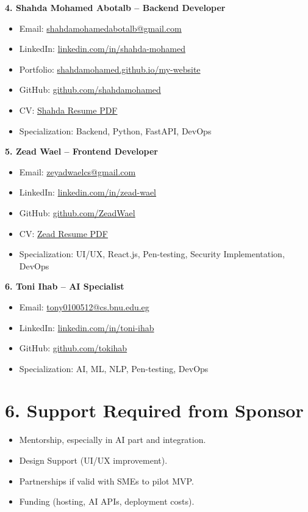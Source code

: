 \documentclass[12pt,a4paper]{article}
\begin{document}
\textbf{4. Shahda Mohamed Abotalb – Backend Developer}  
\begin{itemize}
    \item Email: \href{mailto:shahdamohamedabotalb@gmail.com}{shahdamohamedabotalb@gmail.com}
    \item LinkedIn: \href{https://www.linkedin.com/in/shahda-mohamed-178537280}{linkedin.com/in/shahda-mohamed}
    \item Portfolio: \href{https://shahdamohamed.github.io/my-website}{shahdamohamed.github.io/my-website}
    \item GitHub: \href{https://github.com/shahdamohamed}{github.com/shahdamohamed}
    \item CV: \href{https://shahdamohamed.github.io/my-website/assets/resume.pdf}{Shahda Resume PDF}
    \item Specialization: Backend, Python, FastAPI, DevOps
\end{itemize}

\textbf{5. Zead Wael – Frontend Developer}  
\begin{itemize}
    \item Email: \href{mailto:zeyadwaelcs@gmail.com}{zeyadwaelcs@gmail.com}
    \item LinkedIn: \href{https://www.linkedin.com/in/zead-wael}{linkedin.com/in/zead-wael}
    \item GitHub: \href{https://github.com/ZeadWael}{github.com/ZeadWael}
    \item CV: \href{https://drive.google.com/drive/folders/1mSTjcvvaDnJasdTxr2x36CddeTrQR5dQ?usp=sharing}{Zead Resume PDF}
    \item Specialization: UI/UX, React.js, Pen-testing, Security Implementation, DevOps
\end{itemize}

\textbf{6. Toni Ihab – AI Specialist}  
\begin{itemize}
    \item Email: \href{mailto:tony0100512@cs.bnu.edu.eg}{tony0100512@cs.bnu.edu.eg}
    \item LinkedIn: \href{https://www.linkedin.com/in/toni-ihab/}{linkedin.com/in/toni-ihab}
    \item GitHub: \href{https://github.com/tokihab}{github.com/tokihab}
    \item Specialization: AI, ML, NLP, Pen-testing, DevOps 
\end{itemize}

\section*{6. Support Required from Sponsor}
\begin{itemize}
    \item Mentorship, especially in AI part and integration.
    \item Design Support (UI/UX improvement).
    \item Partnerships if valid with SMEs to pilot MVP.
    \item Funding (hosting, AI APIs, deployment costs).
\end{itemize}
\end{document}
